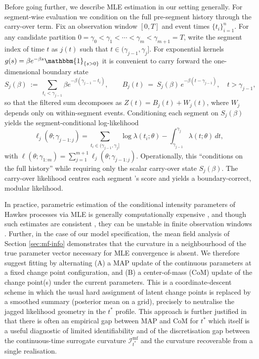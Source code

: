 \documentclass{article}
\theoremstyle{plain}
\theoremstyle{definition}
\newcommand{\1}{\mathbf{1}}
\begin{document}
Before going further, we describe MLE estimation in our setting generally. For segment-wise evaluation we condition on the full pre-segment history through the carry-over term. Fix an observation window $[0,T]$ and event times $\{t_i\}_{i=1}^n$. For any candidate partition
$0=\gamma_0<\gamma_1<\cdots<\gamma_m<\gamma_{m+1}=T$,
write the segment index of time $t$ as $j(t)$ such that $t\in(\gamma_{j-1},\gamma_j]$.
For exponential kernels $g(s)=\beta e^{-\beta s}\mathbbm{1}_{\{s>0\}}$ it is convenient to carry forward the
one-dimensional boundary state
\[
S_j(\beta)\ :=\ \sum_{t_i<\gamma_{j-1}} \beta e^{-\beta(\gamma_{j-1}-t_i)},
\qquad
B_j(t)\ =\ S_j(\beta)\,e^{-\beta(t-\gamma_{j-1})}, \quad t>\gamma_{j-1},
\]
so that the filtered sum decomposes as $Z(t)=B_j(t)+W_j(t)$, where $W_j$ depends only on within-segment events.
Conditioning each segment on $S_j(\beta)$ yields the segment-conditional log-likelihood
\begin{equation}
\label{eq:condlik_new}
\ell_j(\theta;\gamma_{j-1:j})
=
\sum_{t_i\in(\gamma_{j-1},\gamma_j]}
\log \lambda(t_i;\theta)
-
\int_{\gamma_{j-1}}^{\gamma_j}\lambda(t;\theta)\,dt,
\end{equation}
with $\ell(\theta;\gamma_{1:m})=\sum_{j=1}^{m+1}\ell_j(\theta;\gamma_{j-1:j})$.
Operationally, this ``conditions on the full history'' while requiring only the scalar carry-over state $S_j(\beta)$.  The carry-over likelihood centres each segment 's score and yields a boundary-correct, modular likelihood. 


In practice, parametric estimation of the conditional intensity parameters of Hawkes processes via MLE is generally computationally expensive \cite{kresin2023parametric}, and though such estimates are consistent \cite{ogata1978estimators}, they can be unstable in finite observation windows \cite{reinhart2018review,veen2008estimation}. Further, in the case of our model specification, the mean field analysis of Section \ref{sec:mf-info} demonstrates that the curvature in a neighbourhood of the true parameter vector  necessary for MLE convergence is absent.   We therefore suggest fitting by alternating (A) a MAP update of the continuous parameters at a  fixed change point configuration,
and (B) a center-of-mass (CoM) update of the change point(s) under the current parameters.
This is a coordinate-descent scheme in which the usual hard assignment of latent change points is replaced by a
smoothed summary (posterior mean on a grid), precisely to neutralise the jagged likelihood geometry in the $t^\ast$ profile. This approach is further justified in that there is often an empirical gap between MAP and CoM for $t^\ast$ which itself is a useful diagnostic of limited identifiability and of the discretisation gap between the continuous-time surrogate curvature $\mathcal I_{t^\ast}^{\mathrm{mf}}$ and the curvature recoverable from a single realisation.
\end{document}
